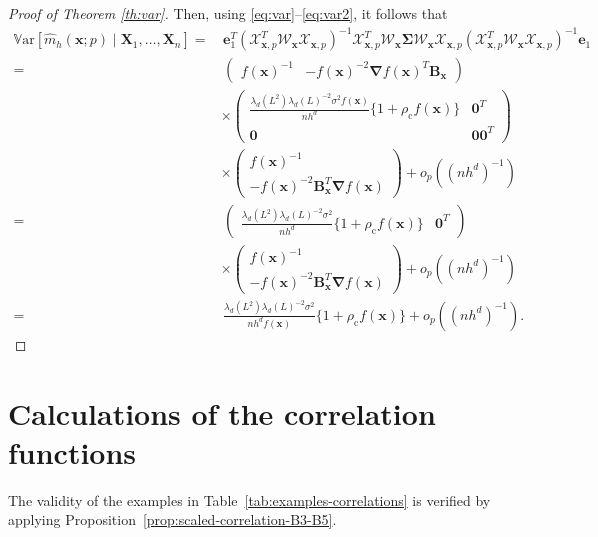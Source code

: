 \documentclass[12pt]{report} %
\newcommand{\bX}{\mathbf{X}}
\newcommand{\bx}{\mathbf{x}}
\newcommand{\be}{\mathbf{e}}
\newcommand{\bSigma}{\boldsymbol\Sigma}
\newcommand{\bB}{\mathbf{B}}
\newcommand{\lc}{\left[}
\newcommand{\rc}{\right]}
\newcommand{\lrp}[1]{\left(#1\right)}
\newcommand{\V}[1]{\mathbb{V}\mathrm{ar}\lc #1\rc}
\begin{document}
\begin{proof}[Proof of Theorem \ref{th:var}]
Then, using \eqref{eq:var}--\eqref{eq:var2}, it follows that 
\begin{align*}\V{\hat{m}_{h}(\bx;p) \mid \bX_1, \ldots, \bX_n}=&\,\be_1^T\left(\mathcal{X}_{\bx, p}^T \mathcal{W}_{\bx} \mathcal{X}_{\bx, p}\right)^{-1} \mathcal{X}_{\bx, p}^T \mathcal{W}_{\bx} \bSigma \mathcal{W}_{\bx} \mathcal{X}_{\bx, p}\left(\mathcal{X}_{\bx, p}^T \mathcal{W}_{\bx} \mathcal{X}_{\bx, p}\right)^{-1} \be_1\\
=&\,\left(\begin{array}{cc}
f(\bx)^{-1} & -f(\bx)^{-2} \boldsymbol{\nabla} f(\bx)^T \bB_{\bx}\end{array}\right)\\
&\times  \left(\begin{array}{cc}
\frac{\lambda_d\left(L^2\right) \lambda_d(L)^{-2}\sigma^2f(\bx)}{nh^d} \{1+\rho_{\mathrm{c}} f(\bx)\}  & \mathbf{0}^T \\
\mathbf{0} & \mathbf{0 0}^T
\end{array}\right)\\
&\times \left(\begin{array}{c}
f(\bx)^{-1}  \\
-f(\bx)^{-2} \bB_{\bx}^T \boldsymbol{\nabla} f(\bx)
\end{array}\right) +o_p\lrp{\lrp{n h^d}^{-1}}
\\
=&\, \left(\begin{array}{cc}
\frac{\lambda_d\left(L^2\right) \lambda_d(L)^{-2}\sigma^2}{nh^d} \{1+\rho_{\mathrm{c}} f(\bx)\}  & \mathbf{0}^T 
\end{array}\right)\\
&\times \left(\begin{array}{c}
f(\bx)^{-1}  \\
-f(\bx)^{-2} \bB_{\bx}^T \boldsymbol{\nabla} f(\bx)
\end{array}\right) +o_p\lrp{\lrp{n h^d}^{-1}}\\
=&\, 
\frac{\lambda_d\left(L^2\right) \lambda_d(L)^{-2}\sigma^2}{nh^d f(\bx)} \{1+\rho_{\mathrm{c}} f(\bx)\}  +o_p\lrp{\lrp{n h^d}^{-1}}.
\end{align*}


\end{proof}

\chapter{Calculations of the correlation functions} \label{ch:calcu}

The validity of the examples in Table~\ref{tab:examples-correlations} is verified by applying Proposition~\ref{prop:scaled-correlation-B3-B5}.
\end{document}

